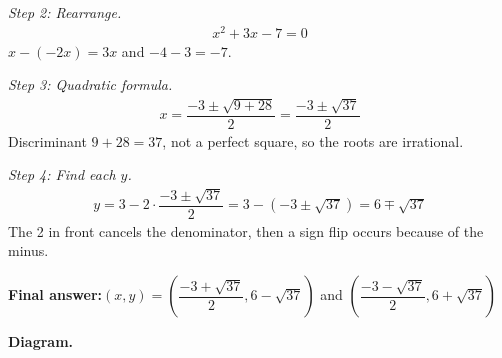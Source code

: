 \documentclass[11pt]{article}
\begin{document}
\textit{Step 2: Rearrange.}
\[\begin{gathered}
x^2 + 3x - 7 = 0
\end{gathered}\]
\( x - (-2x) = 3x \) and \( -4 - 3 = -7 \).

\textit{Step 3: Quadratic formula.}
\[\begin{gathered}
x = \dfrac{-3 \pm \sqrt{9 + 28}}{2} = \dfrac{-3 \pm \sqrt{37}}{2}
\end{gathered}\]
Discriminant \( 9 + 28 = 37 \), not a perfect square, so the roots are irrational.

\textit{Step 4: Find each \( y \).}
\[\begin{gathered}
y = 3 - 2 \cdot \dfrac{-3 \pm \sqrt{37}}{2} = 3 - (-3 \pm \sqrt{37}) = 6 \mp \sqrt{37}
\end{gathered}\]
The 2 in front cancels the denominator, then a sign flip occurs because of the minus.

\begin{answerbox}
\textbf{Final answer:}\quad \(\displaystyle (x, y) = \left(\dfrac{-3 + \sqrt{37}}{2}, 6 - \sqrt{37}\right)\) and \(\displaystyle \left(\dfrac{-3 - \sqrt{37}}{2}, 6 + \sqrt{37}\right)\)
\end{answerbox}
\textbf{Diagram.}
\end{document}
